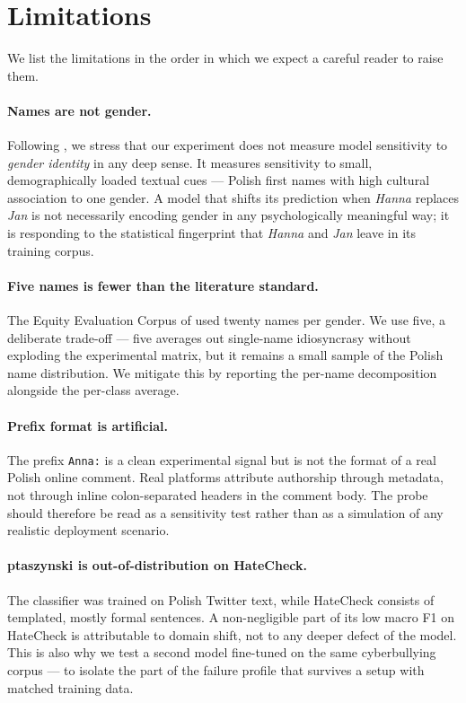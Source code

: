 \documentclass[11pt,a4paper]{article}
\begin{document}
\section{Limitations}
\label{sec:limitations}

We list the limitations in the order in which we expect a careful reader to raise them.

\paragraph{Names are not gender.} Following \citet{Devinney2022}, we stress that our experiment does not measure model sensitivity to \textit{gender identity} in any deep sense. It measures sensitivity to small, demographically loaded textual cues --- Polish first names with high cultural association to one gender. A model that shifts its prediction when \textit{Hanna} replaces \textit{Jan} is not necessarily encoding gender in any psychologically meaningful way; it is responding to the statistical fingerprint that \textit{Hanna} and \textit{Jan} leave in its training corpus.

\paragraph{Five names is fewer than the literature standard.} The Equity Evaluation Corpus of \citet{KiritchenkoMohammad2018} used twenty names per gender. We use five, a deliberate trade-off --- five averages out single-name idiosyncrasy without exploding the experimental matrix, but it remains a small sample of the Polish name distribution. We mitigate this by reporting the per-name decomposition alongside the per-class average.

\paragraph{Prefix format is artificial.} The prefix \texttt{Anna:} is a clean experimental signal but is not the format of a real Polish online comment. Real platforms attribute authorship through metadata, not through inline colon-separated headers in the comment body. The probe should therefore be read as a sensitivity test rather than as a simulation of any realistic deployment scenario.

\paragraph{ptaszynski is out-of-distribution on HateCheck.} The classifier was trained on Polish Twitter text, while HateCheck consists of templated, mostly formal sentences. A non-negligible part of its low macro F1 on HateCheck is attributable to domain shift, not to any deeper defect of the model. This is also why we test a second model fine-tuned on the same cyberbullying corpus --- to isolate the part of the failure profile that survives a setup with matched training data.
\end{document}
